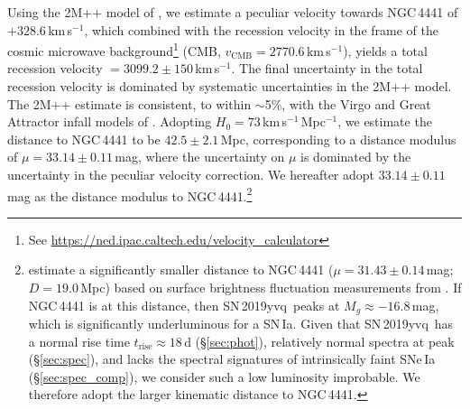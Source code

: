 \documentclass[twocolumn]{aastex63}
\newcommand{\kms}{km\,s$^{-1}$}
\newcommand{\sn}{SN\,2019yvq}
\begin{document}
Using the 2M++ model of \citet{Carrick15}, we estimate a peculiar velocity
towards NGC\,4441 of $+328.6$\,\kms, which combined with the recession
velocity in the frame of the cosmic microwave background\footnote{See
\url{https://ned.ipac.caltech.edu/velocity_calculator}} (CMB, $v_\mathrm{CMB}
= 2770.6$\,\kms), yields a total recession velocity $= 3099.2 \pm 150$\,\kms.
The final uncertainty in the total recession velocity is dominated by
systematic uncertainties in the 2M++ model. The 2M++ estimate is consistent,
to within $\sim$5\%, with the Virgo and Great Attractor infall models of
\citet{Mould00}. Adopting $H_0 = 73$\,\kms\,Mpc$^{-1}$, we estimate the
distance to NGC\,4441 to be $42.5 \pm 2.1$\,Mpc, corresponding to a distance
modulus of $\mu = 33.14 \pm 0.11$\,mag, where the uncertainty on $\mu$ is
dominated by the uncertainty in the peculiar velocity correction. We hereafter
adopt $33.14 \pm 0.11$\,mag as the distance modulus to
NGC\,4441.\footnote{\citet{Tully13} estimate a significantly smaller distance
to NGC\,4441 ($\mu = 31.43 \pm 0.14$\,mag; $D = 19.0$\,Mpc) based on surface
brightness fluctuation measurements from \citet{Tonry01}. If NGC\,4441 is at
this distance, then \sn\ peaks at $M_g \approx -16.8$\,mag, which is
significantly underluminous for a SN\,Ia. Given that \sn\ has a normal rise
time $t_\mathrm{rise} \approx 18$\,d (\S\ref{sec:phot}), relatively normal
spectra at peak (\S\ref{sec:spec}), and lacks the spectral signatures of
intrinsically faint SNe\,Ia (\S\ref{sec:spec_comp}), we consider such a low
luminosity improbable. We therefore adopt the larger kinematic distance to
NGC\,4441.}
\end{document}
